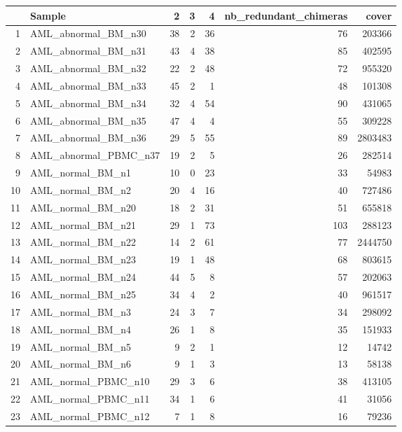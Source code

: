 \documentclass[a4paper]{article}
\begin{document}
\begin{longtable}{rlrrrrr}
  \hline
 & Sample & 2 & 3 & 4 & nb\_redundant\_chimeras & cover \\ 
  \hline
1 & AML\_abnormal\_BM\_n30 &  38 &   2 &  36 &  76 & 203366 \\ 
  2 & AML\_abnormal\_BM\_n31 &  43 &   4 &  38 &  85 & 402595 \\ 
  3 & AML\_abnormal\_BM\_n32 &  22 &   2 &  48 &  72 & 955320 \\ 
  4 & AML\_abnormal\_BM\_n33 &  45 &   2 &   1 &  48 & 101308 \\ 
  5 & AML\_abnormal\_BM\_n34 &  32 &   4 &  54 &  90 & 431065 \\ 
  6 & AML\_abnormal\_BM\_n35 &  47 &   4 &   4 &  55 & 309228 \\ 
  7 & AML\_abnormal\_BM\_n36 &  29 &   5 &  55 &  89 & 2803483 \\ 
  8 & AML\_abnormal\_PBMC\_n37 &  19 &   2 &   5 &  26 & 282514 \\ 
  9 & AML\_normal\_BM\_n1 &  10 &   0 &  23 &  33 & 54983 \\ 
  10 & AML\_normal\_BM\_n2 &  20 &   4 &  16 &  40 & 727486 \\ 
  11 & AML\_normal\_BM\_n20 &  18 &   2 &  31 &  51 & 655818 \\ 
  12 & AML\_normal\_BM\_n21 &  29 &   1 &  73 & 103 & 288123 \\ 
  13 & AML\_normal\_BM\_n22 &  14 &   2 &  61 &  77 & 2444750 \\ 
  14 & AML\_normal\_BM\_n23 &  19 &   1 &  48 &  68 & 803615 \\ 
  15 & AML\_normal\_BM\_n24 &  44 &   5 &   8 &  57 & 202063 \\ 
  16 & AML\_normal\_BM\_n25 &  34 &   4 &   2 &  40 & 961517 \\ 
  17 & AML\_normal\_BM\_n3 &  24 &   3 &   7 &  34 & 298092 \\ 
  18 & AML\_normal\_BM\_n4 &  26 &   1 &   8 &  35 & 151933 \\ 
  19 & AML\_normal\_BM\_n5 &   9 &   2 &   1 &  12 & 14742 \\ 
  20 & AML\_normal\_BM\_n6 &   9 &   1 &   3 &  13 & 58138 \\ 
  21 & AML\_normal\_PBMC\_n10 &  29 &   3 &   6 &  38 & 413105 \\ 
  22 & AML\_normal\_PBMC\_n11 &  34 &   1 &   6 &  41 & 31056 \\ 
  23 & AML\_normal\_PBMC\_n12 &   7 &   1 &   8 &  16 & 79236 \\ 

\end{longtable}
\end{document}
